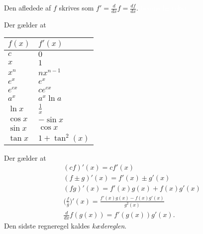 Den afledede af $f$ skrives som $f'=\frac{d}{dx}f=\frac{df}{dx}$.
\textcolor{white}{hemmelig tekst}

Der gælder at
\begin{center}
		\begin{tabular}{@{}l l@{}}
		$f(x)$      & $f'(x)$  				\\ \toprule
		$c$			& $0$ 					\\ \midrule
		$x$			& $1$					\\ \midrule
		$x^n$  		& $nx^{n-1}$			\\ \midrule
		$e^x$  		& $e^x$					\\ \midrule
		$e^{cx}$  	& $ce^{cx}$				\\ \midrule
		$a^x$  		& $a^x\ln a $			\\ \midrule
		$\ln x$ 	& $\frac{1}{x}$			\\ \midrule
		$\cos x$  	& $-\sin x$				\\ \midrule
		$\sin x$  	& $\cos x$				\\ \midrule
		$\tan x$ 	& $1+\tan^2(x)$		\\ \bottomrule  
	\end{tabular}
\end{center}
Der gælder at
\begin{align*}
&(cf)'(x)=cf'(x)\\
&(f\pm g)'(x)=f'(x)\pm g'(x)\\
&(fg)'(x)=f'(x)g(x)+f(x)g'(x)\\
&\Big(\frac{f}{g}\Big)'(x)=\frac{f'(x)g(x)-f(x)g'(x)}{g^2(x)}\\
&\frac{d}{dx}f(g(x))=f'(g(x))g'(x).
\end{align*}
Den sidste regneregel kaldes \emph{kædereglen}.